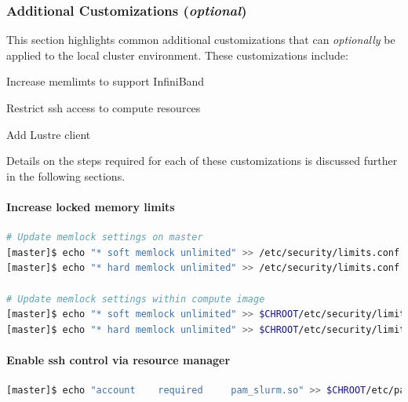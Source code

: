 \documentclass[letterpaper]{article}
\begin{document}
\subsubsection{Additional Customizations ({\em optional})}

This section highlights common additional customizations that
can {\em optionally} be applied to the
local cluster environment. These customizations include:

\begin{itemize*}
\item Increase memlimts to support InfiniBand
\item Restrict ssh access to compute resources
\item Add Lustre client
\end{itemize*}

\noindent Details on the steps required for each of these customizations is
discussed further in the following sections.

\paragraph{Increase locked memory limits}

 

\begin{lstlisting}[language=bash,keywords={},upquote=true]
# Update memlock settings on master
[master]$ echo "* soft memlock unlimited" >> /etc/security/limits.conf
[master]$ echo "* hard memlock unlimited" >> /etc/security/limits.conf

# Update memlock settings within compute image
[master]$ echo "* soft memlock unlimited" >> $CHROOT/etc/security/limits.conf
[master]$ echo "* hard memlock unlimited" >> $CHROOT/etc/security/limits.conf
\end{lstlisting}

\paragraph{Enable ssh control via resource manager} 



\begin{lstlisting}[language=bash,keywords={},upquote=true]
[master]$ echo "account    required     pam_slurm.so" >> $CHROOT/etc/pam.d/sshd
\end{lstlisting}
\end{document}
